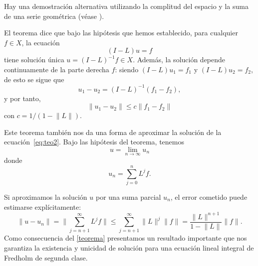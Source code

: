 Hay una demostración alternativa utilizando la complitud del espacio y la suma de una serie geométrica (véase \cite{Atkinson}).
\begin{observacion}
	El teorema dice que bajo las hipótesis que hemos establecido, para cualquier $f \in X$, la ecuación
	\begin{equation}\label{eq:teo2}
		(I-L)u = f
	\end{equation}
	tiene solución única $u = (I-L)^{-1}f \in X$. Además, la solución depende continuamente de la parte derecha $f$: siendo $(I-L)u_1 = f_1$ y $(I-L)u_2 = f_2$, de esto se sigue que
	\begin{equation}
		u_1 - u_2 = (I-L)^{-1}(f_1 - f_2),
	\end{equation}
	y por tanto,
	\begin{equation}
		\lVert u_1 - u_2 \rVert \leqslant c \lVert f_1 - f_2 \rVert
	\end{equation}
	con $c = 1/(1 - \lVert L \rVert)$.
\end{observacion}
\begin{observacion}
	Este teorema también nos da una forma de aproximar la solución de la ecuación~\eqref{eq:teo2}. Bajo las hipótesis del teorema, tenemos
	\begin{equation}
		u = \lim_{n \rightarrow \infty}u_n
	\end{equation}
	donde
	\begin{equation}
		u_n = \sum_{j=0}^{n}L^jf.
	\end{equation}
\end{observacion}
Si aproximamos la solución $u$ por una suma parcial $u_n$, el error cometido puede estimarse explícitamente:
\begin{equation}
	\lVert u-u_n \rVert = \lVert \sum_{j=n+1}^\infty L^jf \rVert \leqslant \sum_{j=n+1}^\infty \lVert L \rVert^j \lVert f \rVert = \dfrac{\lVert L \rVert^{n+1}}{1-\lVert L \rVert}\lVert f \rVert.
\end{equation}
Como consecuencia del \autoref{teorema} presentamos un resultado importante que nos garantiza la existencia y unicidad de solución para una ecuación lineal integral de Fredholm de segunda clase.
